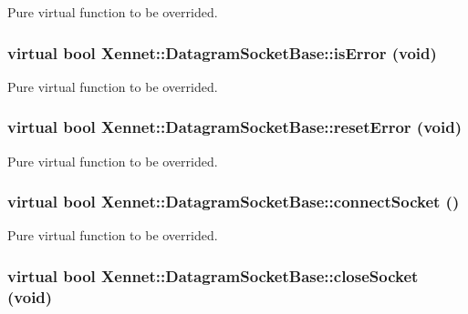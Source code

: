 Pure virtual function to be overrided. 

\hypertarget{classXennet_1_1DatagramSocketBase_b413bb0f043190aa4c00e3be12585510}{
\subsubsection{\setlength{\rightskip}{0pt plus 5cm}virtual bool Xennet::DatagramSocketBase::isError (void)}}
\label{classXennet_1_1DatagramSocketBase_b413bb0f043190aa4c00e3be12585510}


Pure virtual function to be overrided. 

\hypertarget{classXennet_1_1DatagramSocketBase_26651029d023c6aa3f2bfb7c8846cef6}{
\subsubsection{\setlength{\rightskip}{0pt plus 5cm}virtual bool Xennet::DatagramSocketBase::resetError (void)}}
\label{classXennet_1_1DatagramSocketBase_26651029d023c6aa3f2bfb7c8846cef6}


Pure virtual function to be overrided. 

\hypertarget{classXennet_1_1DatagramSocketBase_4781f0e7666365da5d6f00ae54017e30}{
\subsubsection{\setlength{\rightskip}{0pt plus 5cm}virtual bool Xennet::DatagramSocketBase::connectSocket ()}}
\label{classXennet_1_1DatagramSocketBase_4781f0e7666365da5d6f00ae54017e30}


Pure virtual function to be overrided. 

\hypertarget{classXennet_1_1DatagramSocketBase_e149b661f5a880698d1a29d281c556ba}{
\subsubsection{\setlength{\rightskip}{0pt plus 5cm}virtual bool Xennet::DatagramSocketBase::closeSocket (void)}}
\label{classXennet_1_1DatagramSocketBase_e149b661f5a880698d1a29d281c556ba}


